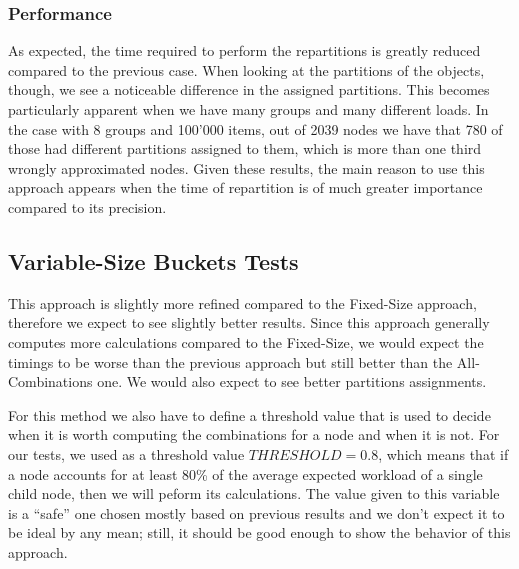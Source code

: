 \subsubsection{Performance}
As expected, the time required to perform the repartitions is greatly reduced compared to the previous case. When looking at the partitions of the objects, though, we see a noticeable difference in the assigned partitions. This becomes particularly apparent when we have many groups and many different loads. In the case with 8 groups and 100'000 items, out of 2039 nodes we have that 780 of those had different partitions assigned to them, which is more than one third wrongly approximated nodes. Given these results, the main reason to use this approach appears when the time of repartition is of much greater importance compared to its precision.

\clearpage
\subsection{Variable-Size Buckets Tests}\label{sec:Variable-Size-buckets-tests}
This approach is slightly more refined compared to the Fixed-Size approach, therefore we expect to see slightly better results. Since this approach generally computes more calculations compared to the Fixed-Size, we would expect the timings to be worse than the previous approach but still better than the All-Combinations one. We would also expect to see better partitions assignments.

For this method we also have to define a threshold value that is used to decide when it is worth computing the combinations for a node and when it is not. For our tests, we used as a threshold value $THRESHOLD = 0.8$, which means that if a node accounts for at least 80\% of the average expected workload of a single child node, then we will peform its calculations. The value given to this variable is a ``safe'' one chosen mostly based on previous results and we don't expect it to be ideal by any mean; still, it should be good enough to show the behavior of this approach.

